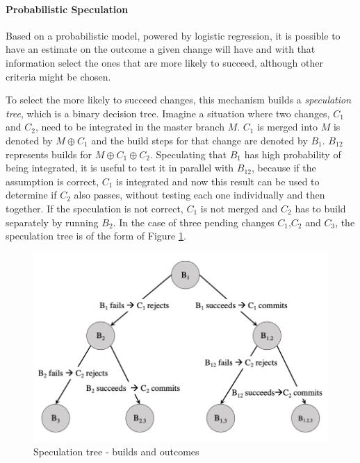 \paragraph{Probabilistic Speculation} 

Based on a probabilistic model, powered by logistic regression, it is possible to have an estimate on the outcome a given change will have and with that information select the ones that are more likely to succeed, although other criteria might be chosen. \par
To select the more likely to succeed changes, this mechanism builds a \textit{speculation tree}, which is a binary decision tree. Imagine a situation where two changes, $C_1$ and $C_2$, need to be integrated in the master branch $M$. $C_1$ is merged into $M$ is denoted by $M \oplus C_1$ and the build steps for that change are denoted by $B_1$. $B_{12}$ represents builds for $M \oplus C_1 \oplus C_2 $.  Speculating that $B_1$ has high probability of being integrated, it is useful to test it in parallel with $B_{12}$, because if the assumption is correct, $C_1$ is integrated and now this result can be used to determine if $C_2$ also passes, without testing each one individually and then together. If the speculation is not correct, $C_1$ is not merged and $C_2$ has to build separately by running $B_2$. In the case of three pending changes $C_1$,$C_2$ and $C_3$, the speculation tree is of the form of Figure \ref{spectree}. 

\begin{figure}[H]
\centering
\includegraphics[scale=0.5, width=0.8\linewidth]{figures/spectree.png}
\caption{Speculation tree - builds and outcomes \cite{Uber}}
\label{spectree}
\end{figure}

